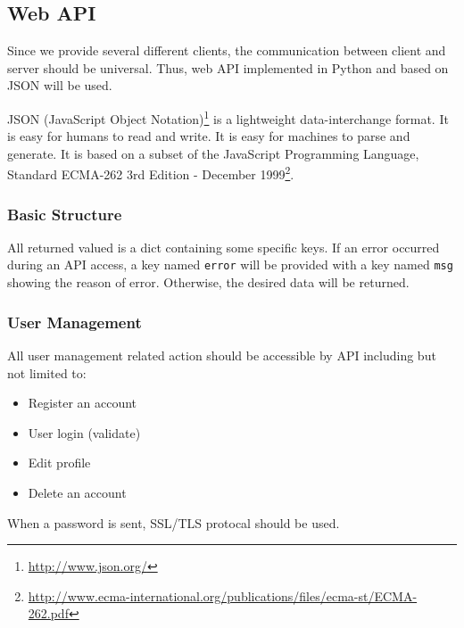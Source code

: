 \subsection{Web API}

\label{sec:webapi}
Since we provide several different clients, the communication between
client and server should be universal. Thus, web API implemented in Python and based on JSON will
be used.

JSON (JavaScript Object Notation)\footnote{\url{http://www.json.org/}} is a lightweight data-interchange
format. It is easy for humans to read and write. It is easy for machines
to parse and generate. It is based on a subset of the JavaScript
Programming Language, Standard ECMA-262 3rd Edition - December 1999\footnote{\url{http://www.ecma-international.org/publications/files/ecma-st/ECMA-262.pdf}}.

\subsubsection{Basic Structure}

All returned valued is a dict containing some specific keys. If an error
occurred during an API access, a key named \texttt{error} will be
provided with a key named \texttt{msg} showing the reason of error.
Otherwise, the desired data will be returned.

\subsubsection{User Management}

All user management related action should be accessible by API including
but not limited to:

\begin{itemize}
\itemsep1pt\parskip0pt
\item
  Register an account
\item
  User login (validate)
\item
  Edit profile
\item
  Delete an account
\end{itemize}

When a password is sent, SSL/TLS protocal should be used.

